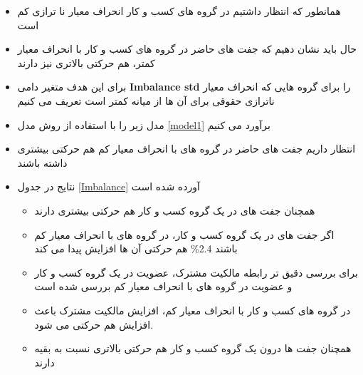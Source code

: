 \documentclass[12pt, a4paper]{article}
\begin{document}
\begin{itemize}
	\item 
	همانطور که انتظار داشتیم در گروه های کسب و کار انحراف معیار نا ترازی کم است
	\item 
	حال باید نشان دهیم که جفت های حاضر  در گروه های کسب و کار با انحراف معیار کمتر، هم حرکتی بالاتری نیز دارند
	\item 
	برای این هدف متغیر دامی 
	\textbf{Imbalance std}
	را برای گروه هایی که انحراف معیار ناترازی حقوقی برای آن ها از میانه کمتر است تعریف می کنیم
	\item 
	مدل زیر را با استفاده از روش مدل 
	\ref{model1}
	برآورد می کنیم
	
	\item 
	انتظار داریم جفت های حاضر در گروه های با انحراف معیار کم هم حرکتی بیشتری داشته باشند
	
\end{itemize}

\begin{itemize}
	\item 
	نتایج در جدول
	\ref{Imbalance}
	آورده شده است
	\begin{LTR}
	\end{LTR}
\begin{itemize}
	\item 
	همچنان جفت های در یک گروه کسب و کار هم حرکتی بیشتری دارند
	\item 
	اگر جفت های در یک گروه کسب و کار، در گروه های با انحراف معیار کم باشند 2.4\% هم حرکتی آن ها افزایش پیدا می کند
	\item 
	برای بررسی دقیق تر رابطه مالکیت مشترک، عضویت در یک گروه کسب و کار و عضویت در گروه های با انحراف معیار کم بررسی شده است
	\item 
	در گروه های کسب و کار با انحراف معیار کم، افزایش مالکیت مشترک باعث افزایش هم حرکتی می شود.
	\item
	همچنان جفت ها درون یک گروه کسب و کار هم حرکتی بالاتری نسبت به بقیه دارند
	
\end{itemize}
\end{itemize}

\FloatBarrier
\end{document}
